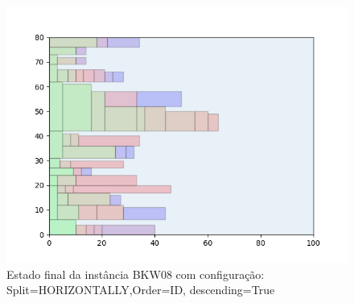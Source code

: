 \begin{figure}[H]
    \centering
    \caption[]{Estado final da instância BKW08 com configuração: Split=HORIZONTALLY,Order=ID, descending=True}
    \label{fig:bkw08-horizontally-id-true}
    \includegraphics[scale=0.5]{output/figures/bkw/bkw08/horizontally/id/true/00}
\end{figure}